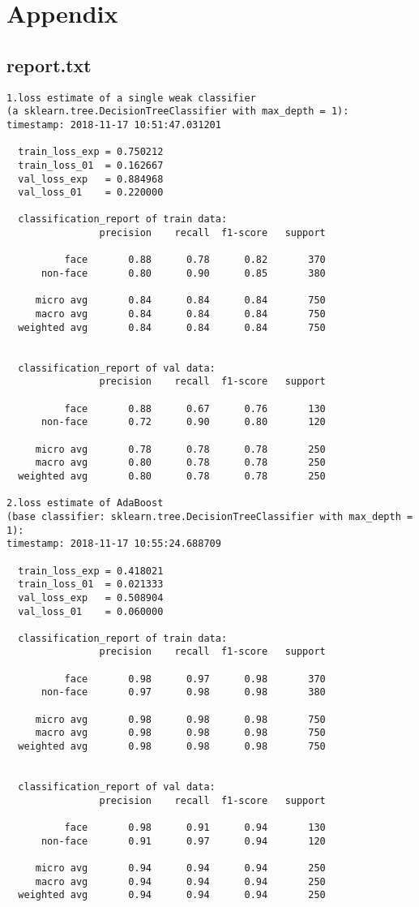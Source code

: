 \documentclass[journal, a4paper]{IEEEtran}
\begin{document}
\newpage

\section{Appendix}

\subsection{report.txt}
\begin{lstlisting}
1.loss estimate of a single weak classifier 
(a sklearn.tree.DecisionTreeClassifier with max_depth = 1):
timestamp: 2018-11-17 10:51:47.031201

  train_loss_exp = 0.750212
  train_loss_01  = 0.162667
  val_loss_exp   = 0.884968
  val_loss_01    = 0.220000

  classification_report of train data:
                precision    recall  f1-score   support

          face       0.88      0.78      0.82       370
      non-face       0.80      0.90      0.85       380

     micro avg       0.84      0.84      0.84       750
     macro avg       0.84      0.84      0.84       750
  weighted avg       0.84      0.84      0.84       750


  classification_report of val data:
                precision    recall  f1-score   support

          face       0.88      0.67      0.76       130
      non-face       0.72      0.90      0.80       120

     micro avg       0.78      0.78      0.78       250
     macro avg       0.80      0.78      0.78       250
  weighted avg       0.80      0.78      0.78       250
    
2.loss estimate of AdaBoost 
(base classifier: sklearn.tree.DecisionTreeClassifier with max_depth = 1):
timestamp: 2018-11-17 10:55:24.688709
    
  train_loss_exp = 0.418021
  train_loss_01  = 0.021333
  val_loss_exp   = 0.508904
  val_loss_01    = 0.060000

  classification_report of train data:
                precision    recall  f1-score   support

          face       0.98      0.97      0.98       370
      non-face       0.97      0.98      0.98       380

     micro avg       0.98      0.98      0.98       750
     macro avg       0.98      0.98      0.98       750
  weighted avg       0.98      0.98      0.98       750


  classification_report of val data:
                precision    recall  f1-score   support

          face       0.98      0.91      0.94       130
      non-face       0.91      0.97      0.94       120

     micro avg       0.94      0.94      0.94       250
     macro avg       0.94      0.94      0.94       250
  weighted avg       0.94      0.94      0.94       250

\end{lstlisting}
\end{document}
